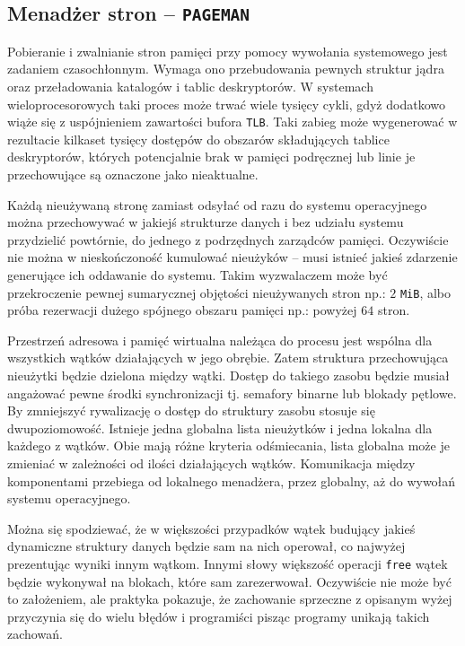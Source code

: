 \documentclass[12pt,a4paper,titlepage,twoside]{mwart}
\begin{document}
\newpage

\subsection{Menadżer stron -- \texttt{PAGEMAN}}

Pobieranie i zwalnianie stron pamięci przy pomocy wywołania systemowego jest
zadaniem czasochłonnym. Wymaga ono przebudowania pewnych struktur jądra oraz
przeładowania katalogów i tablic deskryptorów. W systemach wieloprocesorowych
taki proces może trwać wiele tysięcy cykli, gdyż dodatkowo wiąże się z
uspójnieniem zawartości bufora \texttt{TLB}. Taki zabieg może wygenerować w
rezultacie kilkaset tysięcy dostępów do obszarów składujących tablice
deskryptorów, których potencjalnie brak w pamięci podręcznej lub linie je
przechowujące są oznaczone jako nieaktualne.

Każdą nieużywaną stronę zamiast odsyłać od razu do systemu operacyjnego można
przechowywać w jakiejś strukturze danych i bez udziału systemu przydzielić
powtórnie, do jednego z podrzędnych zarządców pamięci. Oczywiście nie można w
nieskończoność kumulować nieużyków -- musi istnieć jakieś zdarzenie generujące
ich oddawanie do systemu. Takim wyzwalaczem może być przekroczenie pewnej
sumarycznej objętości nieużywanych stron np.: $2$ \verb+MiB+, albo próba
rezerwacji dużego spójnego obszaru pamięci np.: powyżej $64$ stron.

Przestrzeń adresowa i pamięć wirtualna należąca do procesu jest wspólna dla
wszystkich wątków działających w jego obrębie. Zatem struktura przechowująca
nieużytki będzie dzielona między wątki. Dostęp do takiego zasobu będzie musiał
angażować pewne środki synchronizacji tj. semafory binarne lub blokady pętlowe.
By zmniejszyć rywalizację o dostęp do struktury zasobu stosuje się
dwupoziomowość. Istnieje jedna globalna lista nieużytków i jedna lokalna dla
każdego z wątków. Obie mają różne kryteria odśmiecania, lista globalna może je
zmieniać w zależności od ilości działających wątków. Komunikacja między
komponentami przebiega od lokalnego menadżera, przez globalny, aż do wywołań
systemu operacyjnego.

Można się spodziewać, że w większości przypadków wątek budujący jakieś
dynamiczne struktury danych będzie sam na nich operował, co najwyżej
prezentując wyniki innym wątkom. Innymi słowy większość operacji \verb+free+
wątek będzie wykonywał na blokach, które sam zarezerwował. Oczywiście nie może
być to założeniem, ale praktyka pokazuje, że zachowanie sprzeczne z opisanym
wyżej przyczynia się do wielu błędów i programiści pisząc programy unikają
takich zachowań.
\end{document}
